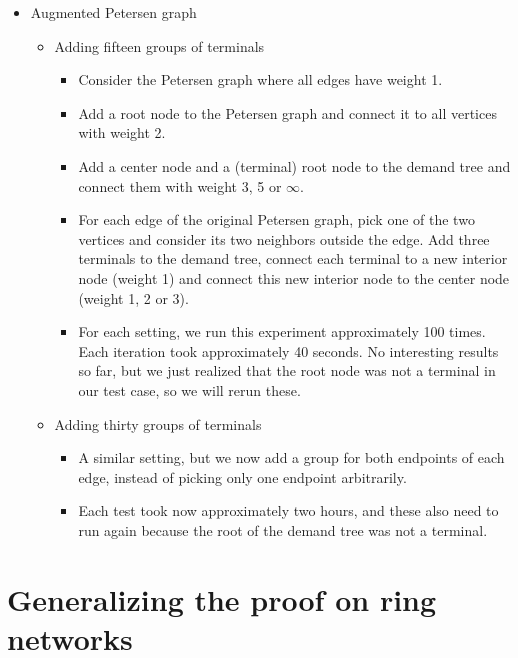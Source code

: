 \documentclass[11pt]{article}
\begin{document}
\begin{itemize}
        \item Augmented Petersen graph
        \begin{itemize}
            \item Adding fifteen groups of terminals
            \begin{itemize}
                \item Consider the Petersen graph where all edges have weight 1.
                \item Add a root node to the Petersen graph and connect it to all vertices with weight 2.
                \item Add a center node and a (terminal) root node to the demand tree and connect them with weight 3, 5 or $\infty$.
                \item For each edge of the original Petersen graph, pick one of the two vertices and consider its two neighbors outside the edge.
                Add three terminals to the demand tree, connect each terminal to a new interior node (weight 1) and connect this new interior node to the center node (weight 1, 2 or 3).
                \item For each setting, we run this experiment approximately 100 times.
                Each iteration took approximately 40 seconds.
                No interesting results so far, but we just realized that the root node was not a terminal in our test case, so we will rerun these.
            \end{itemize}
            \item Adding thirty groups of terminals
            \begin{itemize}
                \item A similar setting, but we now add a group for both endpoints of each edge, instead of picking only one endpoint arbitrarily.
                \item Each test took now approximately two hours, and these also need to run again because the root of the demand tree was not a terminal.
            \end{itemize}

        \end{itemize}
    \end{itemize}


    \section{Generalizing the proof on ring networks}
\end{document}
